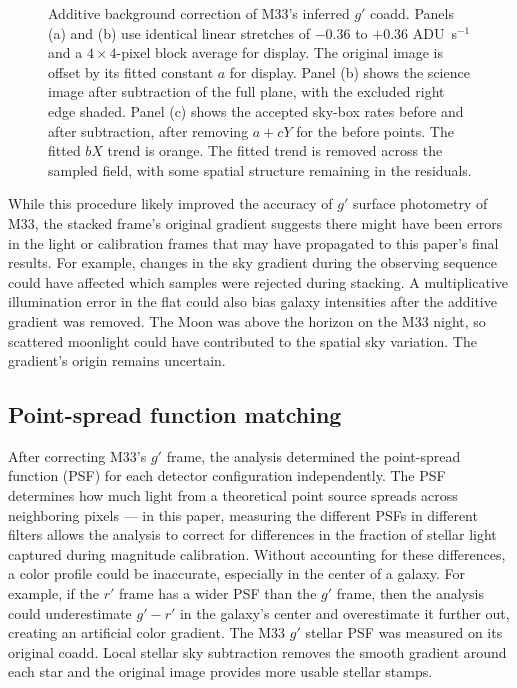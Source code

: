 \begin{figure}[t]
    \caption{Additive background correction of M33's inferred $g'$ coadd. Panels (a) and (b) use identical linear stretches of $-0.36$ to $+0.36$ ADU~s$^{-1}$ and a $4\times4$-pixel block average for display. The original image is offset by its fitted constant $a$ for display. Panel (b) shows the science image after subtraction of the full plane, with the excluded right edge shaded. Panel (c) shows the accepted sky-box rates before and after subtraction, after removing $a+cY$ for the before points. The fitted $bX$ trend is orange. The fitted trend is removed across the sampled field, with some spatial structure remaining in the residuals.}
    \label{fig:m33-background}
\end{figure}

While this procedure likely improved the accuracy of $g'$ surface photometry of M33, the stacked frame's original gradient suggests there might have been errors in the light or calibration frames that may have propagated to this paper's final results. For example, changes in the sky gradient during the observing sequence could have affected which samples were rejected during stacking. A multiplicative illumination error in the flat could also bias galaxy intensities after the additive gradient was removed. The Moon was above the horizon on the M33 night, so scattered moonlight could have contributed to the spatial sky variation. The gradient's origin remains uncertain.

\subsection{Point-spread function matching}
\label{sec:psf}

After correcting M33's $g'$ frame, the analysis determined the point-spread function (PSF) for each detector configuration independently. The PSF determines how much light from a theoretical point source spreads across neighboring pixels --- in this paper, measuring the different PSFs in different filters allows the analysis to correct for differences in the fraction of stellar light captured during magnitude calibration. Without accounting for these differences, a color profile could be inaccurate, especially in the center of a galaxy. For example, if the $r'$ frame has a wider PSF than the $g'$ frame, then the analysis could underestimate $g'-r'$ in the galaxy's center and overestimate it further out, creating an artificial color gradient. The M33 $g'$ stellar PSF was measured on its original coadd. Local stellar sky subtraction removes the smooth gradient around each star and the original image provides more usable stellar stamps.

